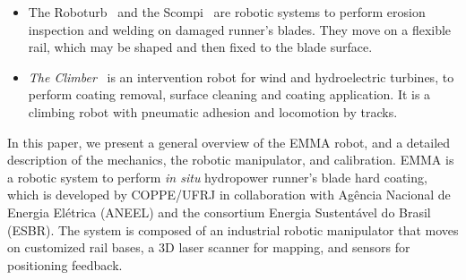 \begin{itemize}
\item The Roboturb~\cite{roboturb} and the Scompi~\cite{scompi} are robotic
systems to perform erosion inspection and welding on damaged runner's blades.
They move on a flexible rail, which may be shaped and then fixed to the blade
surface.

\item \textit{The Climber}~\cite{icm} is an intervention robot for wind and
hydroelectric turbines, to perform coating removal, surface cleaning and
coating application. It is a climbing robot with pneumatic adhesion and
locomotion by tracks.
\end{itemize}

In this paper, we present a general overview of the EMMA robot, and a detailed
description of the mechanics, the robotic manipulator, and calibration. EMMA is
a robotic system to perform \textit{in situ} hydropower runner's blade hard
coating, which is developed by COPPE/UFRJ in collaboration with Agência Nacional
de Energia Elétrica (ANEEL) and the consortium Energia Sustentável do Brasil
(ESBR). The system is composed of an industrial robotic manipulator that moves
on customized rail bases, a 3D laser scanner for mapping, and sensors for positioning
feedback. 
\begin{comment}
The system operate in a confined space, move
on a sloping and slippery environment through a rail, identify the runner's
blades, calibrate its position, generate the path planning and perform the hard
coating. 


This text is organized as follows: a general overview of the robot and its main
challenges are presented in Section \ref{sec:general_overview}, detailed
descriptions of the embedded electronics, the vehicle support system, power
supply system, and software architecture are taken in
Sections \ref{sec:electronics_overview}, \ref{sec:powersupply_overview}, and
\ref{sec:software} respectively.
In Section \ref{sec:results}, preliminary results are shown, and concluding
remarks are drawn in Section \ref{sec:conclusions}.
\end{comment}
